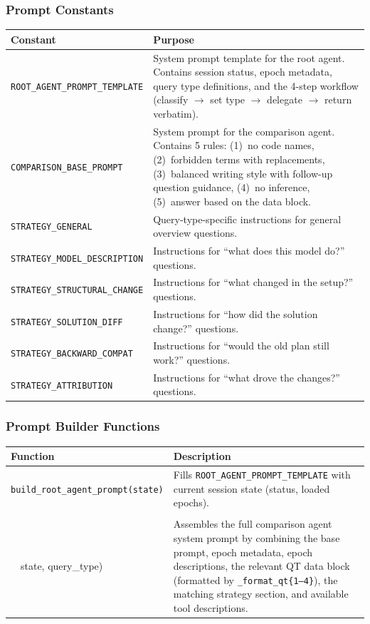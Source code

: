 \documentclass[11pt, a4paper]{article}
\begin{document}
\subsubsection{Prompt Constants}

\begin{longtable}{p{5.5cm} p{9cm}}
\toprule
\textbf{Constant} & \textbf{Purpose} \\
\midrule
\texttt{ROOT\_AGENT\_PROMPT\_TEMPLATE} &
    System prompt template for the root agent.  Contains session status,
    epoch metadata, query type definitions, and the 4-step workflow
    (classify $\to$ set type $\to$ delegate $\to$ return verbatim). \\
\midrule
\texttt{COMPARISON\_BASE\_PROMPT} &
    System prompt for the comparison agent.  Contains 5 rules:
    (1)~no code names, (2)~forbidden terms with replacements,
    (3)~balanced writing style with follow-up question guidance,
    (4)~no inference, (5)~answer based on the data block. \\
\midrule
\texttt{STRATEGY\_GENERAL} &
    Query-type-specific instructions for general overview questions. \\
\texttt{STRATEGY\_MODEL\_DESCRIPTION} &
    Instructions for ``what does this model do?'' questions. \\
\texttt{STRATEGY\_STRUCTURAL\_CHANGE} &
    Instructions for ``what changed in the setup?'' questions. \\
\texttt{STRATEGY\_SOLUTION\_DIFF} &
    Instructions for ``how did the solution change?'' questions. \\
\texttt{STRATEGY\_BACKWARD\_COMPAT} &
    Instructions for ``would the old plan still work?'' questions. \\
\texttt{STRATEGY\_ATTRIBUTION} &
    Instructions for ``what drove the changes?'' questions. \\
\bottomrule
\end{longtable}

\subsubsection{Prompt Builder Functions}

\begin{longtable}{p{6cm} p{8.5cm}}
\toprule
\textbf{Function} & \textbf{Description} \\
\midrule
\texttt{build\_root\_agent\_prompt(state)} &
    Fills \texttt{ROOT\_AGENT\_PROMPT\_TEMPLATE} with current session
    state (status, loaded epochs). \\
\midrule
\texttt{build\_comparison\_agent\_prompt(\\~~state, query\_type)} &
    Assembles the full comparison agent system prompt by combining the
    base prompt, epoch metadata, epoch descriptions, the relevant QT
    data block (formatted by \texttt{\_format\_qt\{1--4\}}), the matching
    strategy section, and available tool descriptions. \\
\bottomrule
\end{longtable}
\end{document}
